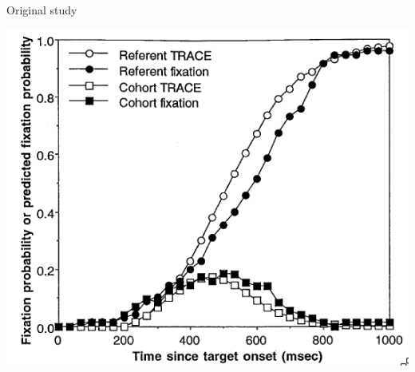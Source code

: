 \documentclass{beamer}
\begin{document}
\begin{frame}{Original study}
\begin{center}
\includegraphics[scale=0.45]{img/allopenna_trace_compare.png}
\end{center}
\end{frame}
\end{document}
